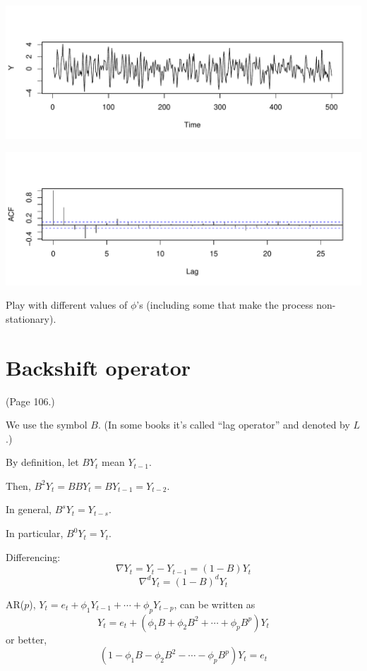 \documentclass[12pt]{article}
\begin{document}
\begin{center}
\includegraphics[width=1.2\textwidth]{lect02-6a.pdf}
\vspace*{-20mm}

\includegraphics[width=1.2\textwidth]{lect02-6b.pdf}
\end{center}

\exercise
Play with different values of $\phi$'s
(including some that make the process non-stationary).

\section{Backshift operator}

(Page 106.)

We use the symbol $B$. (In some books it's called ``lag operator'' and
denoted by $L$.)

By definition, let
$B Y_t$ mean $Y_{t-1}$.

Then,
$B^2 Y_t = B B Y_t = B Y_{t-1} = Y_{t-2}$.

In general,
$B^s Y_t = Y_{t-s}$.

In particular, $B^0 Y_t = Y_t$.

Differencing:
\[
\nabla Y_t = Y_t - Y_{t-1} = (1 - B) Y_t
\]
\[
\nabla^d Y_t = (1 - B)^d Y_t
\]

AR($p$),
$
Y_t = e_t + \phi_1 Y_{t-1} + \dotsb + \phi_p Y_{t-p}
$,
can be written as
\[
Y_t = e_t + (\phi_1B + \phi_2B^2 + \dotsb + \phi_pB^p) Y_t
\]
or better,
\[
(1 - \phi_1B - \phi_2B^2 - \dotsb - \phi_pB^p) Y_t = e_t
\]
\end{document}
